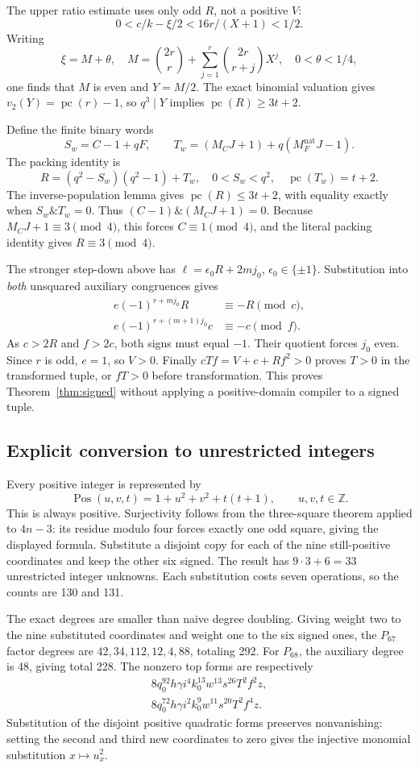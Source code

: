 \documentclass[11pt,a4paper]{article}
\theoremstyle{remark}\newtheorem{remark}[theorem]{Remark}
\newcommand{\ZZ}{\mathbb Z}
\newcommand{\pc}{\operatorname{pc}}
\begin{document}
The upper ratio estimate uses only odd \(R\), not a positive \(V\):
\[
 0<c/k-\xi/2<16r/(X+1)<1/2.
\]
Writing
\[
 \xi=M+\theta,\quad
 M=\binom{2r}{r}+\sum_{j=1}^{r}\binom{2r}{r+j}X^j,
 \quad0<\theta<1/4,
\]
one finds that \(M\) is even and \(Y=M/2\). The exact binomial
valuation gives \(v_2(Y)=\pc(r)-1\), so \(q^3\mid Y\) implies
\(\pc(R)\ge3t+2\).

Define the finite binary words
\[
 S_w=C-1+qF,\qquad
 T_w=(M_CJ+1)+q(M_F^{\mathrm{nat}}J-1).
\]
The packing identity is
\[
 R=(q^2-S_w)(q^2-1)+T_w,
 \quad0<S_w<q^2,\quad\pc(T_w)=t+2.
\]
The inverse-population lemma gives \(\pc(R)\le3t+2\), with equality
exactly when \(S_w\mathbin{\&}T_w=0\). Thus
\((C-1)\mathbin{\&}(M_CJ+1)=0\).
Because \(M_CJ+1\equiv3\pmod4\), this forces \(C\equiv1\pmod4\),
and the literal packing identity gives \(R\equiv3\pmod4\).

The stronger step-down above has
\(\ell=\epsilon_0R+2mj_0\), \(\epsilon_0\in\{\pm1\}\).
Substitution into \emph{both} unsquared auxiliary congruences gives
\begin{align*}
 e(-1)^{r+mj_0}R&\equiv-R\pmod c,\\
 e(-1)^{r+(m+1)j_0}c&\equiv-c\pmod f.
\end{align*}
As \(c>2R\) and \(f>2c\), both signs must equal \(-1\). Their
quotient forces \(j_0\) even. Since \(r\) is odd, \(e=1\), so \(V>0\).
Finally \(cTf=V+c+Rf^2>0\) proves \(T>0\) in the transformed tuple,
or \(fT>0\) before transformation. This proves Theorem~\ref{thm:signed}
without applying a positive-domain compiler to a signed tuple.

\subsection{Explicit conversion to unrestricted integers}

Every positive integer is represented by
\[
 \operatorname{Pos}(u,v,t)=1+u^2+v^2+t(t+1),\qquad u,v,t\in\ZZ.
\]
This is always positive. Surjectivity follows from the three-square
theorem applied to \(4n-3\): its residue modulo four forces exactly one
odd square, giving the displayed formula. Substitute a disjoint copy for
each of the nine still-positive coordinates and keep the other six signed.
The result has \(9\cdot3+6=33\) unrestricted integer unknowns. Each
substitution costs seven operations, so the counts are 130 and 131.

The exact degrees are smaller than naive degree doubling. Giving weight
two to the nine substituted coordinates and weight one to the six signed
ones, the \(P_{67}\) factor degrees are
\(42,34,112,12,4,88\), totaling 292. For \(P_{68}\), the auxiliary
degree is 48, giving total 228. The nonzero top forms are respectively
\begin{gather*}
 8q_0^{92}h\gamma i^4k_0^{13}w^{13}s^{26}T^2f^2z,\\
 8q_0^{72}h\gamma i^2k_0^9w^{11}s^{20}T^2f^4z.
\end{gather*}
Substitution of the disjoint positive quadratic forms preserves
nonvanishing: setting the second and third new coordinates to zero gives
the injective monomial substitution \(x\mapsto u_x^2\).
\end{document}
